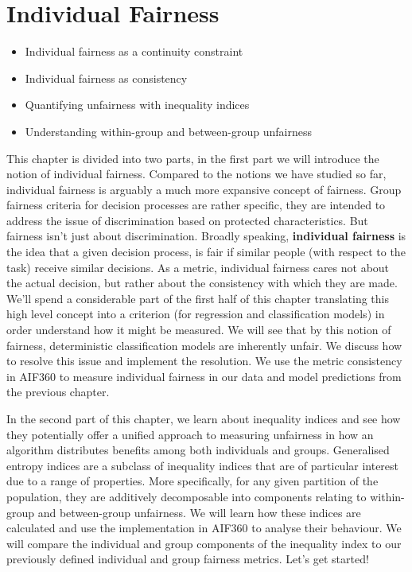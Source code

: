 \chapter{Individual Fairness}\label{ch_IndividualFairness}

\begin{chapsumm}
\begin{itemize}
\item Individual fairness as a continuity constraint
\item Individual fairness as consistency
\item Quantifying unfairness with inequality indices
\item Understanding within-group and between-group unfairness
\end{itemize}
\end{chapsumm}
%
\noindent
%
This chapter is divided into two parts, in the first part we will introduce the notion of individual fairness. Compared to the notions we have studied so far, individual fairness is arguably a much more expansive concept of fairness. Group fairness criteria for decision processes are rather specific, they are intended to address the issue of discrimination based on protected characteristics. But fairness isn't just about discrimination. Broadly speaking, \textbf{individual fairness}\cite{DworkIndFair} is the idea that a given decision process, is fair if similar people (with respect to the task) receive similar decisions. As a metric, individual fairness cares not about the actual decision, but rather about the consistency with which they are made. We'll spend a considerable part of the first half of this chapter translating this high level concept into a criterion (for regression and classification models) in order understand how it might be measured. We will see that by this notion of fairness, deterministic classification models are inherently unfair. We discuss how to resolve this issue and implement the resolution. We use the metric consistency in AIF360 to measure individual fairness in our data and model predictions from the previous chapter.

In the second part of this chapter, we learn about inequality indices and see how they potentially offer a unified approach to measuring unfairness in how an algorithm distributes benefits among both individuals and groups. Generalised entropy indices are a subclass of inequality indices that are of  particular interest due to a range of properties. More specifically, for any given partition of the population, they are additively decomposable into components relating to within-group and between-group unfairness. We will learn how these indices are calculated and use the implementation in AIF360 to analyse their behaviour. We will compare the individual and group components of the inequality index to our previously defined individual and group fairness metrics. Let's get started!

